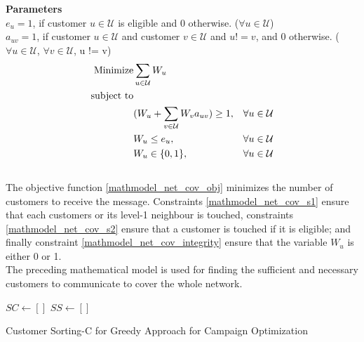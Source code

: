 \documentclass[11pt]{article}
\begin{document}
\noindent \textbf{Parameters}\\

\noindent $e_{u}=1$, if customer $u \in \mathcal{U}$ is eligible and 0 otherwise.
($\forall u \in \mathcal{U}$)\\

\noindent $a_{{u}{v}}=1$, if customer $u \in \mathcal{U}$ and customer $v \in \mathcal{U}$ and $u != v$, and 0 otherwise.
($\forall u \in \mathcal{U}$, $\forall v \in \mathcal{U}$, u != v)\\

\begin{align}
\text{Minimize} & \displaystyle
\sum\limits_{u\in \mathcal{U}}
W_{u} \label{mathmodel_net_cov_obj}&
\\
\text{subject to} \notag\\
&(W_{u}+\sum\limits_{v\in\mathcal{U}}W_{v}a_{{u}{v}}) \geq 1,&\forall u \in \mathcal{U} \label{mathmodel_net_cov_s1}
\\
&W_{u} \leq e_{u} ,&\forall u \in \mathcal{U} \label{mathmodel_net_cov_s2}
\\
&W_{u} \in \{0,1\},&\forall u \in \mathcal{U} \label{mathmodel_net_cov_integrity}
\end{align}\\

The objective function \eqref{mathmodel_net_cov_obj} minimizes the number of customers to receive the message. Constraints \eqref{mathmodel_net_cov_s1} ensure that each customers or its level-1 neighbour is touched, constraints \eqref{mathmodel_net_cov_s2} ensure that a customer is touched if it is eligible; and finally constraint \eqref{mathmodel_net_cov_integrity} ensure that the variable $W_{u}$ is either 0 or 1.\\

The preceding mathematical model is used for finding the sufficient and necessary customers to communicate to cover the whole network.

\begin{algorithm}[H]
\State $SC \gets []$
\State $SS \gets []$

\EndFor
{}
\caption{Customer Sorting-C for Greedy Approach for Campaign Optimization}
\label{algo:cust-sort-c}
\end{algorithm}
\end{document}
